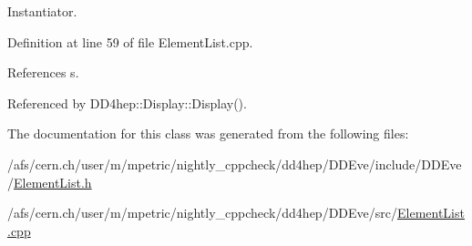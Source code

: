 Instantiator. 

Definition at line 59 of file ElementList.cpp.

References s.

Referenced by DD4hep::Display::Display().

The documentation for this class was generated from the following files:\begin{DoxyCompactItemize}
\item 
/afs/cern.ch/user/m/mpetric/nightly\_\-cppcheck/dd4hep/DDEve/include/DDEve/\hyperlink{_element_list_8h}{ElementList.h}\item 
/afs/cern.ch/user/m/mpetric/nightly\_\-cppcheck/dd4hep/DDEve/src/\hyperlink{_element_list_8cpp}{ElementList.cpp}\end{DoxyCompactItemize}

